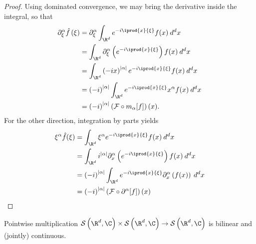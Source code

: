 \documentclass[10pt]{mypackage}
\begin{document}
\begin{proof}
  Using dominated convergence, we may bring the derivative inside the integral, so that
  \begin{align*}
    \partial^{\alpha}_{\xi} \hat{f}\left( \xi \right) &= \partial^{\alpha}_{\xi} \int_{\R^d}^{} e^{-i \iprod{x}{\xi}} f(x)\:d^{d}x\\
                                                      &= \int_{\R^d}^{} \partial^{\alpha}_{\xi}\left( e^{-i \iprod{x}{\xi}} \right) f(x)\:d^{d}x\\
                                                      &=  \int_{\R^d}^{} \left( -ix \right)^{\left\vert \alpha \right\vert} e^{-i \iprod{x}{\xi}}f(x)\:d^{d}x\\
                                                      &= \left( -i \right)^{\left\vert \alpha \right\vert} \int_{\R^d}^{} e^{-i \iprod{x}{\xi}}x^{\alpha}f(x)\:d^{d}x\\
                                                      &= \left( -i \right)^{\left\vert \alpha \right\vert} \left( \mathcal{F}\circ m_{\alpha}[f] \right)(x).
  \end{align*}
  For the other direction, integration by parts yields
  \begin{align*}
    \xi^{\alpha}\hat{f}(\xi) &= \int_{\R^d}^{} \xi^{\alpha}e^{-i \iprod{x}{\xi}}f(x)\:d^{d}x\\
                             &= \int_{\R^d}^{} i^{\left\vert \alpha \right\vert}\partial^{\alpha}_x\left( e^{-i \iprod{x}{\xi}} \right)f(x)\:d^{d}x\\
                             &= \left( -i \right)^{\left\vert \alpha \right\vert} \int_{\R^d}^{} e^{-i \iprod{x}{\xi}}\partial^{\alpha}_x\left( f(x) \right)\:d^{d}x\\
                             &= \left( -i \right)^{\left\vert \alpha \right\vert} \left( \mathcal{F}\circ \partial^{\alpha}[f] \right)(x)
  \end{align*}
\end{proof}
\begin{proposition}
  Pointwise multiplication $\mathcal{S}\left( \R^d,\C \right)\times \mathcal{S}\left( \R^d,\C \right)\rightarrow \mathcal{S}\left( \R^d,\C \right)$ is bilinear and (jointly) continuous.
\end{proposition}
\end{document}
